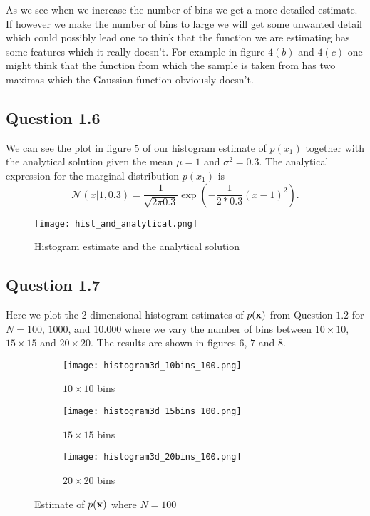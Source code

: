 \documentclass[a4paper,10pt]{article}
\begin{document}
As we see when we increase the number of bins we get a more detailed estimate. If however we make the number of bins to large we will get some unwanted detail which could possibly lead one to think that the function we are estimating has some features which it really doesn't. For example in figure $4(b)$ and $4(c)$ one might think that the function from which the sample is taken from has two maximas which the Gaussian function obviously doesn't.

\subsection*{Question 1.6}

We can see the plot in figure $5$ of our histogram estimate of $p(x_1)$ together with the analytical solution given the mean $\mu = 1$ and $\sigma^2 = 0.3$. The analytical expression for the marginal distribution $p(x_1)$ is
$$\mathcal{N}(x|1, 0.3) = \frac{1}{\sqrt{2\pi 0.3}}\exp\left(-\frac{1}{2*0.3}(x-1)^2 \right).$$

\begin{figure}[H]
	\centering
  	\texttt{[image: hist\_and\_analytical.png]}
  	\caption{Histogram estimate and the analytical solution}
\end{figure}

\subsection*{Question 1.7}

Here we plot the 2-dimensional histogram estimates of $p(\bf{x})$ from Question $1.2$ for $N=100$, $1000$, and $10.000$ where we vary the number of bins between $10 \times 10$, $15 \times 15$ and $20 \times 20$. The results are shown in figures $6$, $7$ and $8$.

\begin{figure}[H]
	\centering
	\begin{subfigure}{0.4\textwidth}
  		\centering
  		\texttt{[image: histogram3d\_10bins\_100.png]}
  		\caption{$10 \times 10$ bins}
  \end{subfigure}
  \begin{subfigure}{0.4\textwidth}
  		\centering
  		\texttt{[image: histogram3d\_15bins\_100.png]}
  		\caption{$15 \times 15$ bins}
  \end{subfigure}
  \begin{subfigure}{0.4\textwidth}
  		\centering
  		\texttt{[image: histogram3d\_20bins\_100.png]}
  		\caption{$20 \times 20$ bins}
  \end{subfigure}
  	\caption{Estimate of $p(\bf{x})$ where $N = 100$}
\end{figure}
\end{document}
